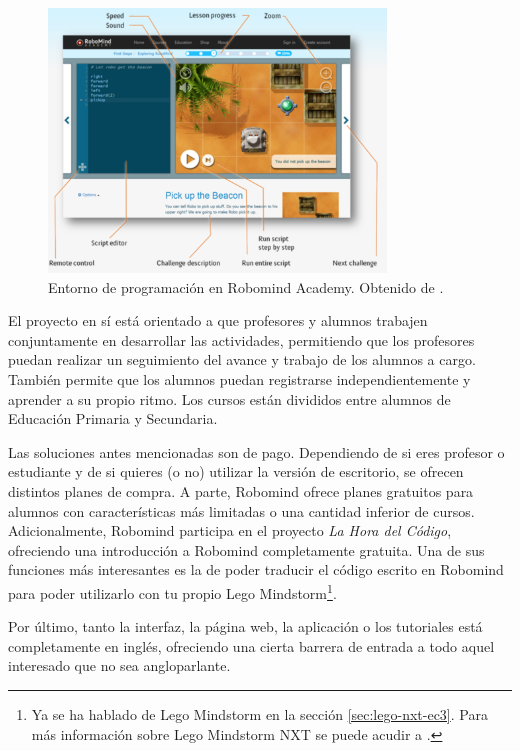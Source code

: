 \begin{figure}[!ht]
	\begin{centering}
		\includegraphics[width=0.8\textwidth]{images/robomind-entorno.png}
			\caption{Entorno de programación en Robomind Academy. Obtenido de \cite{robomind-web}.}
				\label{fig:robomind-entorno}
	\end{centering}
\end{figure}


El proyecto en sí está orientado a que profesores y alumnos trabajen conjuntamente en desarrollar las actividades, permitiendo que los profesores puedan realizar un seguimiento del avance y trabajo de los alumnos a cargo. También permite que los alumnos puedan registrarse independientemente y aprender a su propio ritmo. Los cursos están divididos entre alumnos de Educación Primaria y Secundaria. 

Las soluciones antes mencionadas son de pago. Dependiendo de si eres profesor o estudiante y de si quieres (o no) utilizar la versión de escritorio, se ofrecen distintos planes de compra. 
A parte, Robomind ofrece planes gratuitos para alumnos con características más limitadas o una cantidad inferior de cursos. Adicionalmente, Robomind participa en el proyecto \emph{La Hora del Código}\cite{hour-of-code}, ofreciendo una introducción a Robomind completamente gratuita. Una de sus funciones más interesantes es la de poder traducir el código escrito en Robomind para poder utilizarlo con tu propio Lego Mindstorm\footnote{Ya se ha hablado de Lego Mindstorm en la sección \ref{sec:lego-nxt-ec3}. Para más información sobre Lego Mindstorm NXT se puede acudir a \cite{lego-mindstorm}.}.

Por último, tanto la interfaz, la página web, la aplicación o los tutoriales está completamente en inglés, ofreciendo una cierta barrera de entrada a todo aquel interesado que no sea angloparlante. 

